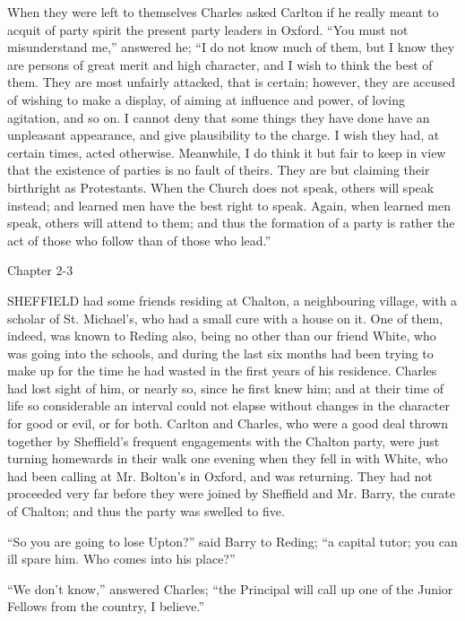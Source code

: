 When they were left to themselves Charles asked Carlton if he
really meant to acquit of party spirit the present party leaders in
Oxford. ``You must not misunderstand me,'' answered he;
``I do not know much of them, but I know they are persons of great
merit and high character, and I wish to think the best of them.
They are most unfairly attacked, that is certain; however, they are
accused of wishing to make a display, of aiming at influence and
power, of loving agitation, and so on. I cannot deny that some things
they have done have an unpleasant appearance, and give plausibility to
the charge. I wish they had, at certain times, acted otherwise.
Meanwhile, I do think it but fair to keep in view that the existence
of parties is no fault of theirs. They are but claiming their
birthright as Protestants. When the Church does not speak, others will
speak instead; and learned men have the best right to speak. Again,
when learned men speak, others will attend to them; and thus the
formation of a party is rather the act of those who follow than of
those who lead.''

Chapter 2-3


SHEFFIELD had some friends residing at
Chalton, a neighbouring village, with a scholar of St. Michael's, who
had a small cure with a house on it. One of them, indeed, was known to
Reding also, being no other than our friend White, who was going into
the schools, and during the last six months had been trying to make up
for the time he had wasted in the first years of his residence.
Charles had lost sight of him, or nearly so, since he first knew him;
and at their time of life so considerable an interval could not elapse
without changes in the character for good or evil, or for both.
Carlton and Charles, who were a good deal thrown together by Sheffield's
frequent engagements with the Chalton party, were just turning
homewards in their walk one evening when they fell in with White, who
had been calling at Mr. Bolton's in Oxford, and was returning. They
had not proceeded very far before they were joined by Sheffield and
Mr. Barry, the curate of Chalton; and thus the party was swelled to
five.

``So you are going to lose Upton?'' said Barry to Reding;
``a capital tutor; you can ill spare him. Who comes into his
place?''

``We don't know,'' answered Charles; ``the Principal
will call up one of the Junior Fellows from the country, I
believe.''

